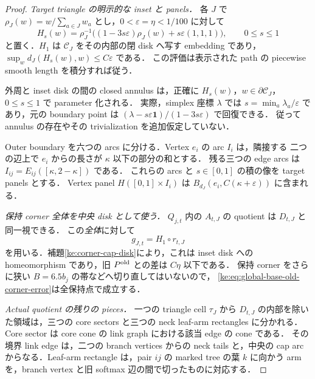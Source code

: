 \begin{proof}
\emph{Target triangle の明示的な inset と panels．}
各 $J$ で $\rho_J(w)=w/\sum_{a\in J}w_a$ とし，$0<\varepsilon=\eta<1/100$ に対して
\[
 H_s(w)=\rho_J^{-1}\bigl((1-3s\varepsilon)\rho_J(w)
                   +s\varepsilon(1,1,1)\bigr),\qquad0\le s\le1
\]
と置く．$H_1$ は $\mathcal C_J$ をその内部の閉 disk へ写す embedding であり，
$\sup_wd_J(H_s(w),w)\le C\varepsilon$ である．
この評価は表示された path の piecewise smooth length を積分すれば従う．

外周と inset disk の間の closed annulus は，正確に
$H_s(w)$，$w\in\partial\mathcal C_J$，$0\le s\le1$ で parameter 化される．
実際，simplex 座標 $\lambda$ では
$s=\min_a\lambda_a/\varepsilon$ であり，元の boundary point は
$(\lambda-s\varepsilon\mathbf1)/(1-3s\varepsilon)$ で回復できる．
従って annulus の存在やその trivialization を追加仮定していない．

Outer boundary を六つの arcs に分ける．Vertex $e_i$ の arc $I_i$ は，隣接する
二つの辺上で $e_i$ からの長さが $\kappa$ 以下の部分の和とする．
残る三つの edge arcs は $I_{ij}=E_{ij}([\kappa,2-\kappa])$ である．
これらの arcs と $s\in[0,1]$ の積の像を target panels とする．
Vertex panel $H([0,1]\times I_i)$ は
$B_{d_J}(e_i,C(\kappa+\varepsilon))$ に含まれる．

\emph{保持 corner 全体を中央 disk として使う．}
$Q_{j,t}$ 内の $A_{t,J}$ の quotient は $D_{t,J}$ と同一視できる．
この\emph{全体}に対して
\[
 g_{J,t}=H_1\circ r_{t,J}
\]
を用いる．補題\ref{ke:corner-cap-disk}により，これは inset disk への
homeomorphism であり，旧 $P^{\rm old}$ との差は $C\eta$ 以下である．
保持 corner をさらに狭い $B=6.5b_j$ の帯などへ切り直してはいないので，
\eqref{ke:eq:global-base-old-corner-error}は全保持点で成立する．

\emph{Actual quotient の残りの pieces．}
一つの triangle cell $\tau_J$ から $D_{t,J}$ の内部を除いた領域は，三つの core
sectors と三つの neck leaf-arm rectangles に分かれる．
Core sector は core cone の link graph における該当 edge の cone である．
その境界 link edge は，二つの branch vertices からの neck tails と，中央の cap arc
からなる．Leaf-arm rectangle は，pair $ij$ の marked tree の葉 $k$ に向かう arm
を，branch vertex と旧 softmax 辺の間で切ったものに対応する．


\end{proof}

